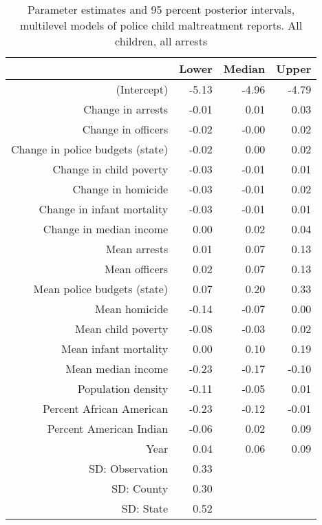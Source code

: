 \begin{table}[ht]
\centering
\caption{Parameter estimates and 95 percent posterior intervals, multilevel models of 
             police child maltreatment reports. All children, all arrests} 
\begin{tabular}{rrrr}
  \hline
 & Lower & Median & Upper \\ 
  \hline
(Intercept) & -5.13 & -4.96 & -4.79 \\ 
  Change in arrests & -0.01 & 0.01 & 0.03 \\ 
  Change in officers & -0.02 & -0.00 & 0.02 \\ 
  Change in police budgets (state) & -0.02 & 0.00 & 0.02 \\ 
  Change in child poverty & -0.03 & -0.01 & 0.01 \\ 
  Change in homicide & -0.03 & -0.01 & 0.02 \\ 
  Change in infant mortality & -0.03 & -0.01 & 0.01 \\ 
  Change in median income & 0.00 & 0.02 & 0.04 \\ 
  Mean arrests & 0.01 & 0.07 & 0.13 \\ 
  Mean officers & 0.02 & 0.07 & 0.13 \\ 
  Mean police budgets (state) & 0.07 & 0.20 & 0.33 \\ 
  Mean homicide & -0.14 & -0.07 & 0.00 \\ 
  Mean child poverty & -0.08 & -0.03 & 0.02 \\ 
  Mean infant mortality & 0.00 & 0.10 & 0.19 \\ 
  Mean median income & -0.23 & -0.17 & -0.10 \\ 
  Population density & -0.11 & -0.05 & 0.01 \\ 
  Percent African American & -0.23 & -0.12 & -0.01 \\ 
  Percent American Indian & -0.06 & 0.02 & 0.09 \\ 
  Year & 0.04 & 0.06 & 0.09 \\ 
  SD: Observation & 0.33 &  &  \\ 
  SD: County & 0.30 &  &  \\ 
  SD: State & 0.52 &  &  \\ 
   \hline
\end{tabular}
\end{table}
